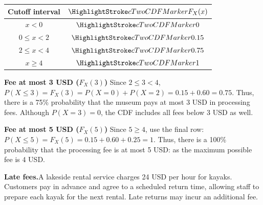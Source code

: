 \par%
\noindent%
\begin{minipage}[t]{.37\linewidth}%
  \vspace{0pt}\centering
  \begin{tabular}{cc}%
    \toprule
    Cutoff interval & $\cTwoCDFHL{F_X(x)}$ \\ \midrule
    $x<0$ & $\cTwoCDFHL{0}$ \\
    $0\leq x<2$ & $\cTwoCDFHL{0.15}$ \\
    $2\leq x<4$ & $\cTwoCDFHL{0.75}$ \\
    $x\geq 4$ & $\cTwoCDFHL{1}$ \\
    \bottomrule%
  \end{tabular}
\end{minipage}%
\hfill%
\begin{minipage}[t]{.60\linewidth}%
  \vspace{0pt}\centering
\end{minipage}%
\par


\textbf{Fee at most 3 USD ($F_X(3)$)} Since $2\leq3<4$,
$P(X\leq3)=F_X(3)=P(X=0)+P(X=2)=0.15+0.60=0.75$.
Thus, there is a 75\% probability that the museum pays at most 3 USD in processing fees. Although $P(X=3)=0$, the CDF
includes all fees below 3 USD as well.

\textbf{Fee at most 5 USD ($F_X(5)$)} Since $5\geq4$, use the final row:
$P(X\leq5)=F_X(5)=0.15+0.60+0.25=1$.
Thus, there is a 100\% probability that the processing fee is at most 5 USD: as the maximum possible fee is 4 USD.
\clearpage
\endgroup
\vfill

 \vspace{-5mm}
\begingroup\small
\textbf{Late fees.}A lakeside rental service charges 24 USD per hour for kayaks. Customers pay in
advance and agree to a scheduled return time, allowing staff to prepare each
kayak for the next rental. Late returns may incur an additional fee.

